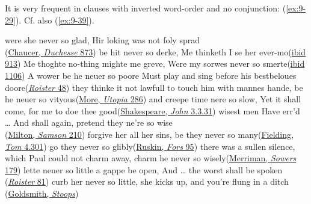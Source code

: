 It is very frequent in clauses with inverted word-order and no conjunction: (\ref{ex:9-29}). Cf. also  (\ref{ex:9-39}).

\ea \label{ex:9-29}
\ea were she never so glad, Hir loking was not foly sprad\\\hfill(\href{https://archive.org/details/minorpoemsedite00chau/page/44/mode/2up?q=%22loking+was+not%22&view=theater}{Chaucer, \textit{Duchesse} 873})
\ex be hit never so derke, Me thinketh I se her ever-mo\hfill(\href{https://archive.org/details/minorpoemsedite00chau/page/44/mode/2up?q=%22hit+never+so+derke%22&view=theater}{ibid 913}) %
\ex Me thoghte no-thing mighte me greve, Were my sorwes never so smerte\hfill(\href{https://archive.org/details/minorpoemsedite00chau/page/52/mode/2up?q=%22were+my+sorwes%22&view=theater}{ibid 1106}) %
\ex A wower be he neuer so poore Must play and sing before his bestbeloues doore\hfill(\href{https://archive.org/details/roisterdoister00udalgoog/page/n54/mode/2up?view=theater&q=%22wower+be+he%22}{\textit{Roister} 48})
\ex they thinke it not lawfull to touch him with mannes hande, be he neuer so vityous\hfill(\href{https://archive.org/details/utopiasirthomas00robigoog/page/n397/mode/2up?q=%22neuer+so+vityous%22&view=theater}{More, \textit{Utopia} 286}) %
\ex and creepe time nere so slow, Yet it shall come, for me to doe thee good\hfill(\href{https://internetshakespeare.uvic.ca/doc/Jn_F1/scene/3.2/index.html#tln-1330}{Shakespeare, \textit{John} 3.3.31})
\ex wisest men Have err'd {\dots} And shall again, pretend they ne're so wise\\\hfill(\href{https://archive.org/details/poeticalworksofj00miltiala/page/514/mode/2up?ref=ol&view=theater&q=%22wisest+men%22}{Milton, \textit{Samson} 210}) %
\ex forgive her all her sins, be they never so many\hfill(\href{https://archive.org/details/bim_eighteenth-century_the-history-of-tom-jones_fielding-henry_1768_4/page/300/mode/2up?q=%22forgive+her+all%22&view=theater}{Fielding, \textit{Tom} 4.301})
\ex go they never so glibly\hfill(\href{https://archive.org/details/forsclavigeralet12rusk/page/n145/mode/2up?view=theater&q=%22never+so+glibly%22}{Ruskin, \textit{Fors} 95})
\ex there was a sullen silence, which Paul could not charm away, charm he never so wisely\hfill(\href{https://archive.org/details/sowersnovel00merr/page/286/mode/2up?q=%22sullen+silence+which+paul%22&view=theater}{Merriman, \textit{Sowers} 179}) %
\z
\ex \label{ex:9-39}
\ea lette neuer so little a gappe be open, And {\dots} the worst shall be spoken\\\hfill(\href{https://archive.org/details/roisterdoister00udalgoog/page/n86/mode/2up?view=theater&q=%22lette+neuer%22}{\textit{Roister} 81})
\ex curb her never so little, she kicks up, and you're flung in a ditch\\\hfill(\href{https://archive.org/details/shestoopstoconqu03gold/page/60/mode/2up?q=%22curb+her+never+so+little%22&view=theater}{Goldsmith, \textit{Stoops}})
\z
\z

